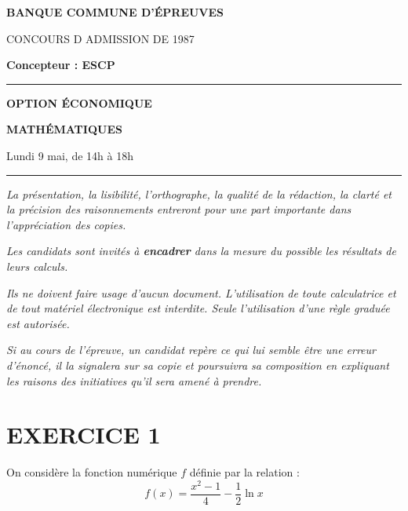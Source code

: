 \documentclass[11pt]{article}%
\begin{document}

\begin{center}
{\LARG\E\textbf{BANQUE COMMUNE D'ÉPREUVES}}



{\large \textsc{CONCOURS D ADMISSION DE 1987}}



{\large \textbf{Concepteur : ESCP}}



\rule{2.39cm}{0.05cm}



{\Large \textbf{OPTION ÉCONOMIQUE}}



{\Large \textbf{MATHÉMATIQUES }}



{\Large Lundi 9 mai, de 14h à 18h}



\rule{2.39cm}{0.05cm}
\end{center}

\textit{La présentation, la lisibilité, l'orthographe, la qualité
de la rédaction, la clarté et la précision des raisonnements
entreront pour une part importante dans l'appréciation des copies.}

\textit{Les candidats sont invités à \textbf{encadrer} dans la mesure
du possible les résultats de leurs calculs.}

\textit{Ils ne doivent faire usage d'aucun document. L'utilisation de
toute
calculatrice et de tout matériel électronique est interdite. Seule
l'utilisation d'une règle graduée est autorisée.}

\textit{Si au cours de l'épreuve, un candidat repère ce qui lui semble
être une erreur d'énoncé, il la signalera sur sa copie et
poursuivra sa composition en expliquant les raisons des initiatives
qu'il sera
amené à prendre.}

\vspace*{3cm}

\section*{EXERCICE 1}

On considère la fonction numérique $f$ définie par la relation : 
\[
f(x) = \dfrac{x^{2}-1}{4}-\dfrac{1}{2}\ln x
\]
\end{document}
